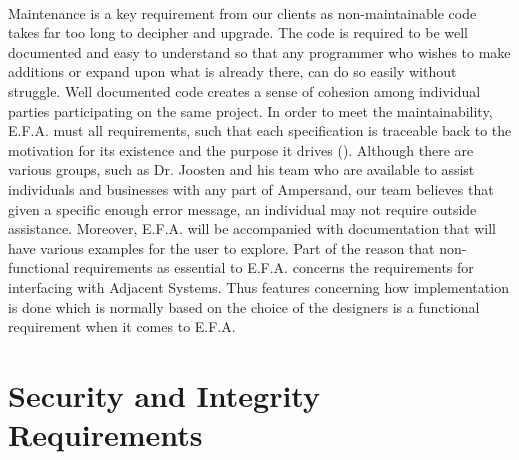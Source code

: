 \documentclass[12pt]{report}
\begin{document}
\paragraph*{}
Maintenance is a key requirement from our clients as non-maintainable code takes far too long to 
decipher and upgrade. The code is required to be well documented and easy to understand so that any 
programmer who wishes to make additions or expand upon what is already there, can do so easily 
without struggle. Well documented code creates a sense of cohesion among individual parties 
participating on the same project. In order to meet the maintainability, E.F.A. must all 
requirements, such that each specification is traceable back to the motivation for its existence 
and the purpose it drives (\cite[2]{derFun}).
Although there are various groups, such as Dr. Joosten and his team who are available to assist 
individuals and businesses with any part of Ampersand, our team believes that given a specific 
enough error message, an individual may not require outside assistance. Moreover, E.F.A. will be 
accompanied with documentation that will have various examples for the user to explore. 
Part of the reason that non-functional requirements as essential to E.F.A. concerns the 
requirements for interfacing with Adjacent Systems. Thus features concerning how implementation is 
done which is normally based on the choice of the designers is a functional requirement when it 
comes to E.F.A. 
  

\section{Security and Integrity Requirements}\label{sec:Security}
\end{document}
